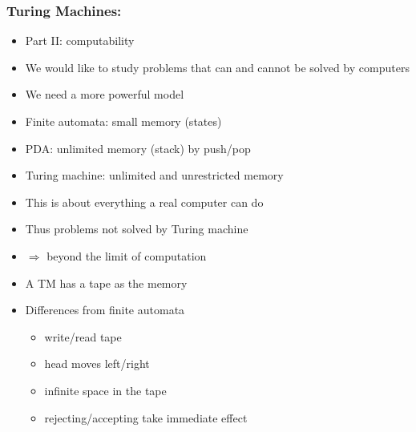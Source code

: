 




\begin{frame}[allowframebreaks]
\frametitle{Turing Machines:}
  \begin{itemize}
\item Part II: computability 
\item [] We would like to study
  problems that can  and cannot be solved by computers
\item We need a more powerful model

\item [] Finite automata: small memory (states)

\item [] PDA: unlimited memory (stack) by push/pop
\item Turing machine: unlimited and unrestricted memory

\item This is about everything a real computer can do

\item Thus problems not solved by Turing machine

\item [] $\Rightarrow$ beyond the limit of computation
\item A TM has a tape as the memory

\begin{center}
\end{center}


\item Differences from finite automata
  \begin{itemize}
  \item write/read tape
  \item head moves left/right
  \item infinite space in the tape
  \item rejecting/accepting take immediate effect


\end{itemize}
\end{itemize}
\end{frame}
